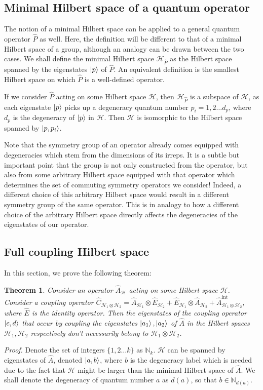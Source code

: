 \documentclass[12pt]{article}
\newtheorem{full_coupling_hilbert_space}
{Theorem}
\begin{document}
	\subsection{Minimal Hilbert space of a quantum operator}
	
	The notion of a minimal Hilbert space can be applied to a general quantum operator $\hat{P}$ as well. Here, the definition will be different to that of a minimal Hilbert space of a group, although an analogy can be drawn between the two cases. We shall define the minimal Hilbert space $\mathcal{H}_{\hat{P}}$ as the Hilbert space spanned by the eigenstates $\ket{p}$ of $\hat{P}$. An equivalent definition is the smallest Hilbert space on which $\hat{P}$ is a well-defined operator.
	
	If we consider $\hat{P}$ acting on some Hilbert space $\mathcal{H}$, then $\mathcal{H}_{\hat{P}}$ is a subspace of $\mathcal{H}$, as each eigenstate $\ket{p}$ picks up a degeneracy quantum number $p_i=1,2\dots d_p$, where $d_p$ is the degeneracy of $\ket{p}$ in $\mathcal{H}$. Then $\mathcal{H}$ is isomorphic to the Hilbert space spanned by $\ket{p, p_i}$.
	
	Note that the symmetry group of an operator already comes equipped with degeneracies which stem from the dimensions of its irreps. It is a subtle but important point that the group is not only constructed from the operator, but also from some arbitrary Hilbert space equipped with that operator which determines the set of commuting symmetry operators we consider! Indeed, a different choice of this arbitrary Hilbert space would result in a different symmetry group of the same operator. This is in analogy to how a different choice of the arbitrary Hilbert space directly affects the degeneracies of the eigenstates of our operator.
	
	\subsection{Full coupling Hilbert space}\label{coupling_space}
	In this section, we prove the following theorem:
	\begin{full_coupling_hilbert_space}
	Consider an operator $\hat{A}_{\mathcal{H}}$ acting on some Hilbert space $\mathcal{H}$. Consider a coupling operator $\hat{C}_{\mathcal{H}_1\otimes\mathcal{H}_2}=\hat{A}_{\mathcal{H}_1}\otimes \hat{E}_{\mathcal{H}_2}+\hat{E}_{\mathcal{H}_1}\otimes\hat{A}_{\mathcal{H}_2}+\hat{A}^{\text{int}}_{\mathcal{H}_1\otimes\mathcal{H}_2}$, where $\hat{E}$ is the identity operator. Then the eigenstates of the coupling operator $\ket{c, d}$ that occur by coupling the eigenstates $\ket{a_1},\ket{a_2}$ of $\hat{A}$ in the Hilbert spaces $\mathcal{H}_1,\mathcal{H}_2$ respectively don't necessarily belong to $\mathcal{H}_1\otimes\mathcal{H}_2$.
	\end{full_coupling_hilbert_space}
	\textit{Proof.} Denote the set of integers $\{1,2\dots k\}$ as $\mathbb{N}_k$. $\mathcal{H}$ can be spanned by eigenstates of $\hat{A}$, denoted $\ket{a, b}$, where $b$ is the degeneracy label which is needed due to the fact that $\mathcal{H}$ might be larger than the minimal Hilbert space of $\hat{A}$. We shall denote the degeneracy of quantum number $a$ as $d(a)$, so that $b\in\mathbb{N}_{d(a)}$.
	
\end{document}
